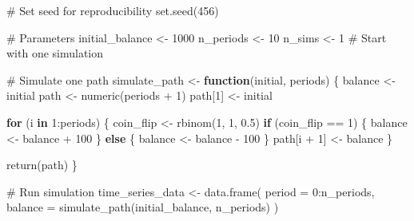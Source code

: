 \documentclass[
  letterpaper,
  DIV=11,
  numbers=noendperiod]{scrartcl}
\newenvironment{Shaded}{\begin{snugshade}}{\end{snugshade}}
\newcommand{\AttributeTok}[1]{\textcolor[rgb]{0.40,0.45,0.13}{#1}}
\newcommand{\CommentTok}[1]{\textcolor[rgb]{0.37,0.37,0.37}{#1}}
\newcommand{\ControlFlowTok}[1]{\textcolor[rgb]{0.00,0.23,0.31}{\textbf{#1}}}
\newcommand{\DecValTok}[1]{\textcolor[rgb]{0.68,0.00,0.00}{#1}}
\newcommand{\FloatTok}[1]{\textcolor[rgb]{0.68,0.00,0.00}{#1}}
\newcommand{\FunctionTok}[1]{\textcolor[rgb]{0.28,0.35,0.67}{#1}}
\newcommand{\NormalTok}[1]{\textcolor[rgb]{0.00,0.23,0.31}{#1}}
\newcommand{\OtherTok}[1]{\textcolor[rgb]{0.00,0.23,0.31}{#1}}
\newcommand{\SpecialCharTok}[1]{\textcolor[rgb]{0.37,0.37,0.37}{#1}}
\theoremstyle{definition}
\theoremstyle{remark}
\begin{document}
\begin{Shaded}
\begin{Highlighting}[]
\CommentTok{\# Set seed for reproducibility}
\FunctionTok{set.seed}\NormalTok{(}\DecValTok{456}\NormalTok{)}

\CommentTok{\# Parameters}
\NormalTok{initial\_balance }\OtherTok{\textless{}{-}} \DecValTok{1000}
\NormalTok{n\_periods }\OtherTok{\textless{}{-}} \DecValTok{10}
\NormalTok{n\_sims }\OtherTok{\textless{}{-}} \DecValTok{1}  \CommentTok{\# Start with one simulation}

\CommentTok{\# Simulate one path}
\NormalTok{simulate\_path }\OtherTok{\textless{}{-}} \ControlFlowTok{function}\NormalTok{(initial, periods) \{}
\NormalTok{  balance }\OtherTok{\textless{}{-}}\NormalTok{ initial}
\NormalTok{  path }\OtherTok{\textless{}{-}} \FunctionTok{numeric}\NormalTok{(periods }\SpecialCharTok{+} \DecValTok{1}\NormalTok{)}
\NormalTok{  path[}\DecValTok{1}\NormalTok{] }\OtherTok{\textless{}{-}}\NormalTok{ initial}
  
  \ControlFlowTok{for}\NormalTok{ (i }\ControlFlowTok{in} \DecValTok{1}\SpecialCharTok{:}\NormalTok{periods) \{}
\NormalTok{    coin\_flip }\OtherTok{\textless{}{-}} \FunctionTok{rbinom}\NormalTok{(}\DecValTok{1}\NormalTok{, }\DecValTok{1}\NormalTok{, }\FloatTok{0.5}\NormalTok{)}
    \ControlFlowTok{if}\NormalTok{ (coin\_flip }\SpecialCharTok{==} \DecValTok{1}\NormalTok{) \{}
\NormalTok{      balance }\OtherTok{\textless{}{-}}\NormalTok{ balance }\SpecialCharTok{+} \DecValTok{100}
\NormalTok{    \} }\ControlFlowTok{else}\NormalTok{ \{}
\NormalTok{      balance }\OtherTok{\textless{}{-}}\NormalTok{ balance }\SpecialCharTok{{-}} \DecValTok{100}
\NormalTok{    \}}
\NormalTok{    path[i }\SpecialCharTok{+} \DecValTok{1}\NormalTok{] }\OtherTok{\textless{}{-}}\NormalTok{ balance}
\NormalTok{  \}}
  
  \FunctionTok{return}\NormalTok{(path)}
\NormalTok{\}}

\CommentTok{\# Run simulation}
\NormalTok{time\_series\_data }\OtherTok{\textless{}{-}} \FunctionTok{data.frame}\NormalTok{(}
  \AttributeTok{period =} \DecValTok{0}\SpecialCharTok{:}\NormalTok{n\_periods,}
  \AttributeTok{balance =} \FunctionTok{simulate\_path}\NormalTok{(initial\_balance, n\_periods)}
\NormalTok{)}


\end{Highlighting}
\end{Shaded}
\end{document}
